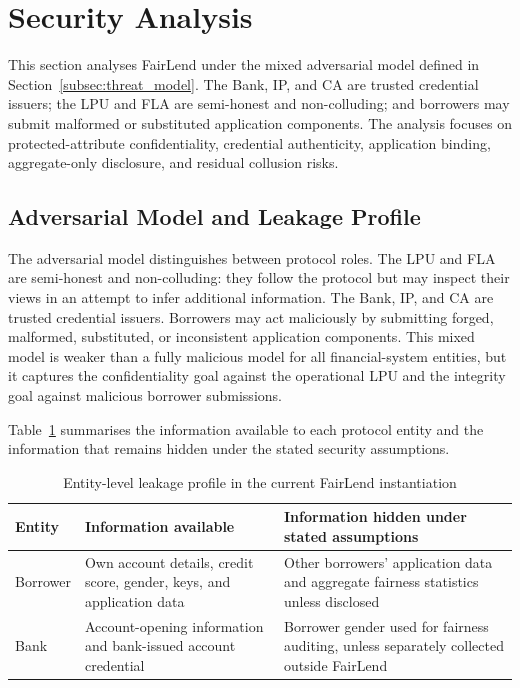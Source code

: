 \documentclass[a4paper,fleqn]{cas-dc}
\begin{document}
{\color{red}

\section{Security Analysis}
\label{sec:security}

This section analyses FairLend under the mixed adversarial model defined in Section~\ref{subsec:threat_model}. The Bank, IP, and CA are trusted credential issuers; the LPU and FLA are semi-honest and non-colluding; and borrowers may submit malformed or substituted application components. The analysis focuses on protected-attribute confidentiality, credential authenticity, application binding, aggregate-only disclosure, and residual collusion risks.

\subsection{Adversarial Model and Leakage Profile}

The adversarial model distinguishes between protocol roles. The LPU and FLA
are semi-honest and non-colluding: they follow the protocol but may inspect
their views in an attempt to infer additional information. The Bank, IP, and CA are trusted credential issuers. Borrowers may act maliciously by submitting
forged, malformed, substituted, or inconsistent application components. This mixed model is weaker than a fully malicious model for all financial-system entities, but it captures the confidentiality goal against the operational LPU and the integrity goal against malicious borrower submissions.

Table~\ref{tab:leakage_profile} summarises the information available to each
protocol entity and the information that remains hidden under the stated
security assumptions.

\begin{table}[htbp]
\centering
\caption{Entity-level leakage profile in the current FairLend instantiation}
\label{tab:leakage_profile}
\scriptsize
\begin{tabular}{|p{2.2cm}|p{6.0cm}|p{6.0cm}|}
\hline
\textbf{Entity} & \textbf{Information available} & \textbf{Information hidden under stated assumptions} \\
\hline
Borrower & Own account details, credit score, gender, keys, and application data & Other borrowers' application data and aggregate fairness statistics unless disclosed \\
\hline
Bank & Account-opening information and bank-issued account credential & Borrower gender used for fairness auditing, unless separately collected outside FairLend \\
\hline


\end{tabular}
\end{table}}
\end{document}
